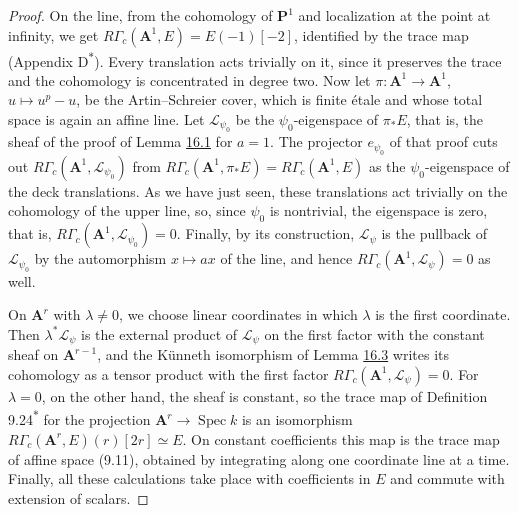 \documentclass[11pt]{article}
\newcommand{\bpout}[1]{#1\textsuperscript{\hyperlink{bp-outside}{\ensuremath{\ast}}}}
\begin{document}
\begin{proof}[{Proof}]\label{bp14}%
On the line, from the cohomology of \(\mathbf P^1\) and localization at the point at infinity, we get \(R\Gamma_c(\mathbf A^1,E)=E(-1)[-2]\), identified by the trace map (Appendix \bpout{D}). Every translation acts trivially on it, since it preserves the trace and the cohomology is concentrated in degree two. Now let \(\pi:\mathbf A^1\to\mathbf A^1\), \(u\mapsto u^p-u\), be the Artin–Schreier cover, which is finite étale and whose total space is again an affine line. Let \(\mathcal L_{\psi_0}\) be the \(\psi_0\)-eigenspace of \(\pi_*E\), that is, the sheaf of the proof of Lemma \hyperref[bp5]{16.1} for \(a=1\). The projector \(e_{\psi_0}\) of that proof cuts out \(R\Gamma_c(\mathbf A^1,\mathcal L_{\psi_0})\) from \(R\Gamma_c(\mathbf A^1,\pi_*E)=R\Gamma_c(\mathbf A^1,E)\) as the \(\psi_0\)-eigenspace of the deck translations. As we have just seen, these translations act trivially on the cohomology of the upper line, so, since \(\psi_0\) is nontrivial, the eigenspace is zero, that is, \(R\Gamma_c(\mathbf A^1,\mathcal L_{\psi_0})=0\). Finally, by its construction, \(\mathcal L_\psi\) is the pullback of \(\mathcal L_{\psi_0}\) by the automorphism \(x\mapsto ax\) of the line, and hence \(R\Gamma_c(\mathbf A^1,\mathcal L_\psi)=0\) as well.

On \(\mathbf A^r\) with \(\lambda\ne0\), we choose linear coordinates in which \(\lambda\) is the first coordinate. Then \(\lambda^*\mathcal L_\psi\) is the external product of \(\mathcal L_\psi\) on the first factor with the constant sheaf on \(\mathbf A^{r-1}\), and the Künneth isomorphism of Lemma \hyperref[bp10]{16.3} writes its cohomology as a tensor product with the first factor \(R\Gamma_c(\mathbf A^1,\mathcal L_\psi)=0\). For \(\lambda=0\), on the other hand, the sheaf is constant, so the trace map of Definition \bpout{9.24} for the projection \(\mathbf A^r\to\operatorname{Spec}k\) is an isomorphism \(R\Gamma_c(\mathbf A^r,E)(r)[2r]\simeq E\). On constant coefficients this map is the trace map of affine space (9.11), obtained by integrating along one coordinate line at a time. Finally, all these calculations take place with coefficients in \(E\) and commute with extension of scalars.
\end{proof}


\end{document}

